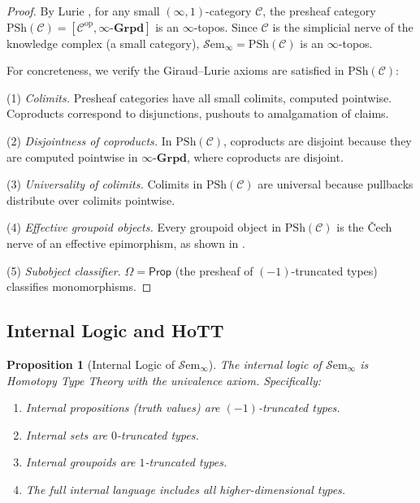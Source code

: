 \documentclass[11pt,a4paper]{article}
\theoremstyle{plain}
\newtheorem{proposition}[theorem]{Proposition}
\theoremstyle{definition}
\theoremstyle{remark}
\newcommand{\Grpd}{\boldsymbol{\infty}\text{-}\mathbf{Grpd}}
\newcommand{\Prop}{\mathsf{Prop}}
\newcommand{\op}{\mathrm{op}}
\newcommand{\PSh}{\mathrm{PSh}}
\begin{document}
\begin{proof}
By Lurie \cite[Proposition~6.1.1.1]{lurie2009higher}, for any small $(\infty,1)$-category $\mathcal{C}$, the presheaf category $\PSh(\mathcal{C}) = [\mathcal{C}^{\op}, \Grpd]$ is an $\infty$-topos. Since $\mathcal{C}$ is the simplicial nerve of the knowledge complex (a small category), $\mathcal{S}\mathrm{em}_\infty = \PSh(\mathcal{C})$ is an $\infty$-topos.

For concreteness, we verify the Giraud--Lurie axioms are satisfied in $\PSh(\mathcal{C})$:

(1) \emph{Colimits.} Presheaf categories have all small colimits, computed pointwise. Coproducts correspond to disjunctions, pushouts to amalgamation of claims.

(2) \emph{Disjointness of coproducts.} In $\PSh(\mathcal{C})$, coproducts are disjoint because they are computed pointwise in $\Grpd$, where coproducts are disjoint.

(3) \emph{Universality of colimits.} Colimits in $\PSh(\mathcal{C})$ are universal because pullbacks distribute over colimits pointwise.

(4) \emph{Effective groupoid objects.} Every groupoid object in $\PSh(\mathcal{C})$ is the \v{C}ech nerve of an effective epimorphism, as shown in \cite[Proposition~6.1.2.11]{lurie2009higher}.

(5) \emph{Subobject classifier.} $\Omega = \Prop$ (the presheaf of $(-1)$-truncated types) classifies monomorphisms.
\end{proof}

\subsection{Internal Logic and HoTT}\label{sec:internal-logic}

\begin{proposition}[Internal Logic of $\mathcal{S}\mathrm{em}_\infty$]\label{prop:internal-logic}
The internal logic of $\mathcal{S}\mathrm{em}_\infty$ is Homotopy Type Theory with the univalence axiom. Specifically:
\begin{enumerate}[nosep]
  \item Internal propositions (truth values) are $(-1)$-truncated types.
  \item Internal sets are $0$-truncated types.
  \item Internal groupoids are $1$-truncated types.
  \item The full internal language includes all higher-dimensional types.
\end{enumerate}
\end{proposition}
\end{document}
